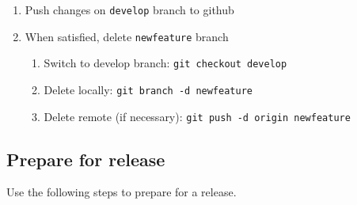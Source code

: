 \documentclass{article}
\begin{document}
\begin{enumerate}
  \item Push changes on \texttt{develop} branch to github
  \item When satisfied, delete \texttt{newfeature} branch
  \begin{enumerate}

    \item Switch to develop branch: \texttt{git checkout develop}

    \item Delete locally: \texttt{git branch -d newfeature}

    \item Delete remote (if necessary): \texttt{git push -d origin newfeature} 

  \end{enumerate}
\end{enumerate}


\subsection{Prepare for release} 
\label{sec:prep-for-release}

Use the following steps to prepare for a release.
\end{document}
